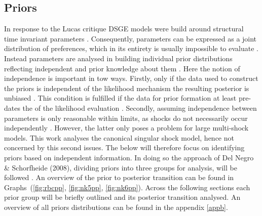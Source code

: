 \documentclass[12pt,a4paper,english]{article} %
\begin{document}
			
	\subsection{Priors} \label{priors}
	In response to the Lucas critique \ac{DSGE} models were build around structural time invariant parameters \cite{lucas_jr_tobin_1981}. Consequently, parameters can be expressed as a joint distribution of preferences, which in its entirety is usually impossible to evaluate \cite{del_negro_forming_2008}. Instead parameters are analysed in building individual prior distributions reflecting independent and prior knowledge about them \cite{del_negro_forming_2008}. Here the notion of independence is important in tow ways. Firstly, only if the data used to construct the priors is independent of the likelihood mechanism the resulting posterior is unbiased \cite{del_negro_forming_2008}. This condition is fulfilled if the data for prior formation at least pre-dates the of the likelihood evaluation \cite{herbst_bayesian_2016}. Secondly, assuming independence between parameters is only reasonable within limits, as shocks do not necessarily occur independently \cite{herbst_bayesian_2016}. However, the latter only poses a problem for large multi-shock models. This work analyses the canonical singular shock model, hence not concerned by this second issues. The below will therefore focus on identifying priors based on independent information. In doing so the approach of Del Negro \& Schorfheide (2008), dividing priors into three groups for analysis, will be followed \cite{del_negro_forming_2008}. An overview of the prior to posterior transition can be found in Graphs~(\ref{fig:rbcpp}, \ref{fig:nk5pp}, \ref{fig:nk6pp}). Across the following sections each prior group will be briefly outlined and its posterior transition analysed. An overview of all priors distributions can be found in the appendix \ref{appb}. 
	
\end{document}
